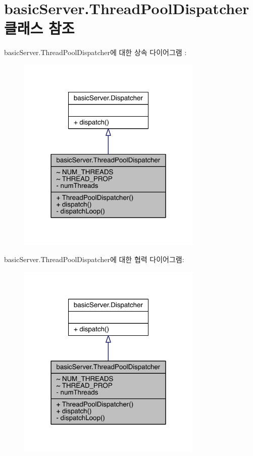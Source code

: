 \hypertarget{classbasic_server_1_1_thread_pool_dispatcher}{\section{basic\+Server.\+Thread\+Pool\+Dispatcher 클래스 참조}
\label{classbasic_server_1_1_thread_pool_dispatcher}
}


basic\+Server.\+Thread\+Pool\+Dispatcher에 대한 상속 다이어그램 \+: 
\nopagebreak
\begin{figure}[H]
\begin{center}
\leavevmode
\includegraphics[width=250pt]{classbasic_server_1_1_thread_pool_dispatcher__inherit__graph}
\end{center}
\end{figure}


basic\+Server.\+Thread\+Pool\+Dispatcher에 대한 협력 다이어그램\+:
\nopagebreak
\begin{figure}[H]
\begin{center}
\leavevmode
\includegraphics[width=250pt]{classbasic_server_1_1_thread_pool_dispatcher__coll__graph}
\end{center}
\end{figure}
